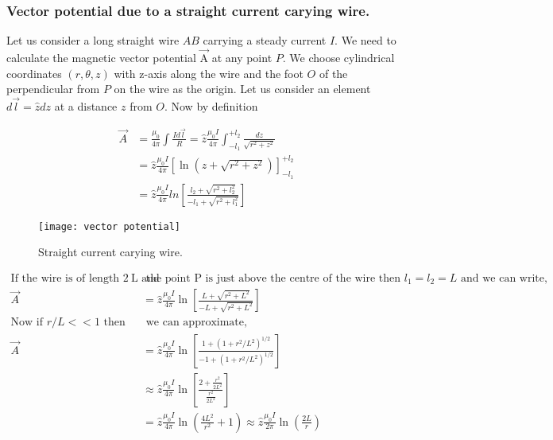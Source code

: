 \subsubsection{Vector potential due to a straight current carying wire.}
Let us consider a long straight wire $A B$ carrying a steady current $I$. We need to calculate the magnetic vector potential $\vec{\mathrm{A}}$ at any point $P .$ We choose cylindrical coordinates $(r, \theta, z)$ with z-axis along the wire and the foot $O$ of the perpendicular from $P$ on the wire as the origin. Let us consider an element $d \vec{l}=\hat{z} d z$ at a distance $z$ from $O$. Now by definition\\
\begin{minipage}{0.65\textwidth}
\begin{align*}
\vec{A}&=\frac{\mu_{0}}{4 \pi} \int \frac{I d \vec{l}}{R}=\hat{z} \frac{\mu_{0} I}{4 \pi} \int_{-l_{1}}^{+l_{2}} \frac{d z}{\sqrt{r^{2}+z^{2}}}\\&=\hat{z} \frac{\mu_{0} I}{4 \pi}\left[\ln \left(z+\sqrt{r^{2}+z^{2}}\right)\right]_{-l_{1}}^{+l_{2}}\\
&=\hat{z} \frac{\mu_{0} I}{4 \pi} l n\left[\frac{l_{2}+\sqrt{r^{2}+l_{2}^{2}}}{-l_{1}+\sqrt{r^{2}+l_{1}^{2}}}\right]
\end{align*}
\end{minipage}
\begin{minipage}{0.35\textwidth}
	\begin{figure}[H]
		\centering
		\texttt{[image: vector potential]}
		\caption{Straight current carying wire.}
		\label{Straight current carying wire.}
	\end{figure}
\end{minipage}
\begin{align*}
\text{If the wire is of length $2 \mathrm{~L}$ and}&\text{  the point $\mathrm{P}$ is just above the centre of the wire then $l_{1}=l_{2}=L$ and we can write,}\\
\vec{A}&=\hat{z} \frac{\mu_{0} I}{4 \pi} \ln \left[\frac{L+\sqrt{r^{2}+L^{2}}}{-L+\sqrt{r^{2}+L^{2}}}\right]\\
\text{Now if $r / L<<1$ then }&\text{ we can approximate,}\\
\vec{A}&=\hat{z} \frac{\mu_{0} I}{4 \pi} \ln \left[\frac{1+\left(1+r^{2} / L^{2}\right)^{1 / 2}}{-1+\left(1+r^{2} / L^{2}\right)^{1 / 2}}\right]\\
&\approx \hat{z} \frac{\mu_{0} I}{4 \pi} \ln \left[\frac{2+\frac{r^{2}}{2 L^{2}}}{\frac{r^2}{2L^2}}\right]\\
&=\hat{z} \frac{\mu_{0} I}{4 \pi} \ln \left(\frac{4 L^{2}}{r^{2}}+1\right) \approx \hat{z} \frac{\mu_{0} I}{2 \pi} \ln \left(\frac{2 L}{r}\right)
\end{align*}

